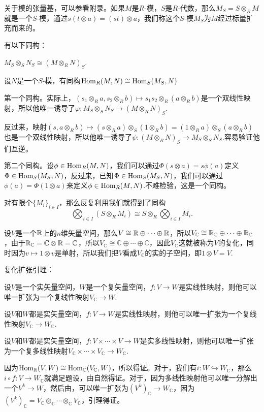 \documentclass[11pt]{article}
\theoremstyle{definition}
\theoremstyle{plain}
\newcommand{\cc}{\mathbb{C}}
\begin{document}
\para 关于模的张量基，可以参看附录。如果$M$是$R$-模，$S$是$R$-代数，那么$M_S=S\otimes_R M$就是一个$S$-模，通过$s(t\otimes a)=(st)\otimes a$，我们称这个$S$-模$M_S$为$M$经过标量扩充而来的。

\lem 有以下同构：

 $M_S\otimes_S N_S\cong (M\otimes_R N)_S$.

 设$N$是一个$S$-模，有同构$\operatorname{Hom}_R(M,N)\cong \operatorname{Hom}_S(M_S,N)$

\proof 第一个同构。实际上，$(s_1\otimes_R a,s_2\otimes_R b)\mapsto s_1s_2\otimes_R(a\otimes_R b)$是一个双线性映射，所以他唯一诱导了$\varphi:M_S\otimes_S N_S\to (M\otimes_R N)_S$.

反过来，映射$(s,a\otimes_R b)\mapsto (s\otimes_R a)\otimes_S (1\otimes_R b)=(1\otimes_R a)\otimes_S (a\otimes_R b)$也是一个双线性映射，所以他唯一诱导了$\psi:(M\otimes_R N)_S\to M_S\otimes_S N_S$.容易验证他们互逆。

第二个同构。设$\phi\in \operatorname{Hom}_R(M,N)$，我们可以通过$\Phi(s\otimes a)=s\phi(a)$定义$\Phi\in \operatorname{Hom}_S(M_S,N)$，反过来，已知$\Phi\in \operatorname{Hom}_S(M_S,N)$，我们可以通过$\phi(a)=\Phi(1\otimes a)$来定义$\phi\in \operatorname{Hom}_R(M,N)$.不难检验，这是一个同构。 \endproof

对有限个$\{M_i\}_{i\in I}$，那么反复利用我们就得到了同构
\[
\bigotimes_{i\in I} \left(S\otimes_RM_i\right)\cong S\otimes_R\bigotimes_{i\in I} M_i.
\]

\para 设$V$是一个$\mathbb{R}$上的$n$维矢量空间，那么$V\cong \mathbb{R}\oplus \cdots \oplus \mathbb{R}$，所以$V_{\cc}\cong \rr_{\cc}\oplus \cdots \oplus \rr_{\cc}$，由于$\rr_{\cc}=\cc\otimes \rr=\cc$，所以$V_{\cc}\cong \cc\oplus \cdots \oplus \cc$，因此$V_{\cc}$这就被称为$V$的复化，同时因为$v\mapsto 1\otimes v$是单射，所以我们把$V$看成$V_\cc$的实的子空间，即$1\otimes V=V$.

\lem 复化扩张引理：

设$V$是一个实矢量空间，$W$是一个复矢量空间，$f:V\to W$是实线性映射，则他可以唯一扩张为一个复线性映射$V_\cc\to W$.

设$V$和$W$都是实矢量空间，$f:V\to W$是实线性映射，则他可以唯一扩张为一个复线性映射$V_\cc\to W_\cc$.

设$V$和$W$都是实矢量空间，$f:V\times\cdots\times V\to W$是实多线性映射，则他可以唯一扩张为一个复多线性映射$V_\cc\times\cdots\times V_\cc\to W_\cc$.

\proof 
	因为$\Hom_\rr(V,W)\cong \Hom_\cc(V_\cc,W)$，所以得证。对于，我们有$i:W\hookrightarrow W_\cc$，那么$i\circ f:V\to W_\cc$就满足题设，由自然得证。对于，因为多线性映射他可以唯一分解出一个$V^k\to W$，然后由，可以唯一扩张为$(V^k)_\cc\to W_\cc$，因为$(V^k)_\cc=V_\cc\otimes_\cc \cdots\otimes_\cc V_\cc$，引理得证。
\endproof
\end{document}
